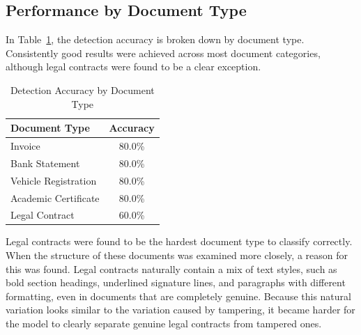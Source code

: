 \subsection{Performance by Document Type}

In Table~\ref{tab:doc_type}, the detection accuracy is broken down by document type. Consistently good results were achieved across most document categories, although legal contracts were found to be a clear exception.

\begin{table}[H]
    \centering
    \caption{Detection Accuracy by Document Type}
    \begin{tabular}{lc} \hline
        \textbf{Document Type} & \textbf{Accuracy} \\ \hline
        Invoice & 80.0\% \\
        Bank Statement & 80.0\% \\
        Vehicle Registration & 80.0\% \\
        Academic Certificate & 80.0\% \\
        Legal Contract & 60.0\% \\ \hline
    \end{tabular}
    \label{tab:doc_type}
\end{table}

\noindent Legal contracts were found to be the hardest document type to classify correctly. When the structure of these documents was examined more closely, a reason for this was found. Legal contracts naturally contain a mix of text styles, such as bold section headings, underlined signature lines, and paragraphs with different formatting, even in documents that are completely genuine. Because this natural variation looks similar to the variation caused by tampering, it became harder for the model to clearly separate genuine legal contracts from tampered ones.\\

